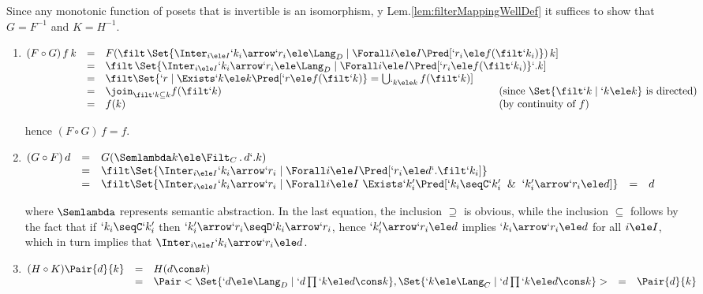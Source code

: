 \documentclass{CSML}
\begin{document}
\proof%
Since any monotonic function of posets that is invertible is an isomorphism,
y Lem.\skp\ref{lem:filterMappingWellDef} it suffices to show that $G = F^{-1}$ and $K = H^{-1}$.

 \begin{enumerate} \itemsep 2pt

 \item
 $ \begin{array}[t]{@{}lll@{\kern-2cm}l}
(F \circ G)\,f\,k 
	&=& 
F (\filt\,\Set{\Inter_{i \ele I} `k_i\arrow `r_i \ele \Lang_D \mid \Forall i \ele I \Pred[ `r_i \ele f(\filt `k_i) }) \, k ] \\
	&=& 
\filt\,\Set{\Inter_{i \ele I} `k_i\arrow `r_i \ele \Lang_D \mid \Forall i \ele I \Pred [ `r_i \ele f(\filt `k_i) } `.k ] \\ 
	&=& 
\filt\Set{`r \mid \Exists `k \ele k \Pred [ `r \ele f(\filt `k)} = \bigcup_{`k \ele k } f(\filt`k) ] \\ 
	&=& 
\join_{\filt`k \subseteq k } f(\filt`k) & (\textrm{since }\Set{\filt`k \mid `k \ele k } \textrm{ is directed}) \\ 
	&=& 
f(k) & (\textrm{by continuity of }f)
 \end{array} $

\noindent
hence $(F \circ G)\,f = f$.

 \item
 $ \begin{array}[t]{@{}lllll}
(G \circ F) \, d 
	& = & 
G(\Semlambda k \ele \Filt_C \, . \, d`.k) \\ 
	& = & 
\filt \Set{\Inter_{i \ele I} `k_i\arrow `r_i \mid \Forall i \ele I \Pred [ `r_i \ele d `.\filt `k_i ] } \\ 
	& = & 
\filt \Set{\Inter_{i \ele I} `k_i\arrow `r_i \mid \Forall i \ele I ~ \Exists `k'_i \Pred [`k_i \seqC `k'_i \And `k'_i\arrow `r_i \ele d ] } %
	& = & 
d
 \end{array} $

\noindent
where $\Semlambda$ represents semantic abstraction.
In the last equation, the inclusion $\supseteq$ is obvious, while the inclusion $\subseteq$ follows by the fact that if $`k_i \seqC `k'_i$ then $`k'_i\arrow `r_i \seqD `k_i\arrow `r_i$, hence $`k'_i\arrow `r_i \ele d$ implies $`k_i\arrow `r_i \ele d$ for all $i \ele I$, which in turn implies that $\Inter_{i \ele I} `k_i\arrow `r_i \ele d$.

 \item
 $ \begin{array}[t]{@{}lllll}
	(H \circ K) \Pair{d }{ k } & = & H (d\cons k) \\ 
	& = & \Pair< \Set{`d \ele \Lang_D \mid `d\prod `k \ele d\cons k } , \Set{`k \ele \Lang_C \mid `d\prod `k \ele d\cons k } > %
	& = & \Pair{d }{ k }
 \end{array} $


\end{enumerate}
\end{document}
